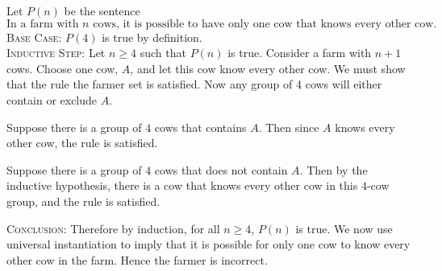 \documentclass{article}
\begin{document}
    \vspace{1.5mm}
    Let $P(n)$ be the sentence $$\text{In a farm with $n$ cows, it is possible to have only one cow that knows every other cow.}$$
    \textsc{Base Case}: $P(4)$ is true by definition. \\
    \textsc{Inductive Step}: Let $n \ge 4$ such that $P(n)$ is true. Consider a farm with $n + 1$ cows. Choose one cow, $A$, and let this cow know every other cow. We must show that the rule the farmer set is satisfied. Now any group of 4 cows will either contain or exclude $A$.
    
    \begin{Cases}
        \item Suppose there is a group of $4$ cows that contains $A$. Then since $A$ knows every other cow, the rule is satisfied.
        \item Suppose there is a group of $4$ cows that does not contain $A$. Then by the inductive hypothesis, there is a cow that knows every other cow in this $4$-cow group, and the rule is satisfied.
    \end{Cases}
    \textsc{Conclusion}: Therefore by induction, for all $n \ge 4$, $P(n)$ is true.
    We now use universal instantiation to imply that it is possible for only one cow to know every other cow in the farm. Hence the farmer is incorrect.
\end{document}
